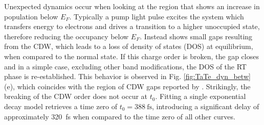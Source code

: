 Unexpected dynamics occur when looking at the region that shows an increase in population below $E_F$.
Typically a pump light pulse excites the system which transfers energy to electrons and drives a transition to a higher unoccupied state, therefore reducing the occupancy below $E_F$.
Instead  shows small gaps resulting from the CDW, which leads to a loss of density of states (DOS) at equilibrium, when compared to the normal state.
If this charge order is broken, the gap closes and in a simple case, excluding other band modifications, the DOS of the RT phase is re-established.
This behavior is observed in Fig. \ref{fig:TaTe_dyn_betw} (e), which coincides with the region of CDW gaps reported by \cite{lin_evidence_2022}.
Strikingly, the breaking of the CDW order does not occur at $t_0$.
Fitting a single exponential decay model retrieves a time zero of $t_0=\qty{388}{\femto\second}$, introducing a significant delay of approximately \qty{320}{\femto\second} when compared to the time zero of all other curves.

